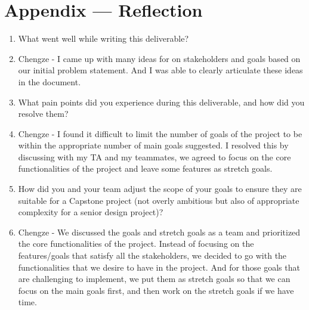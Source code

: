 \documentclass{article}
\begin{document}


\newpage{}

\section*{Appendix --- Reflection}




\begin{enumerate}
    \item What went well while writing this deliverable? 
    \item Chengze - I came up with many ideas for on stakeholders and goals based on our 
    initial problem statement. And I was able to clearly articulate these ideas in the document.

    \item What pain points did you experience during this deliverable, and how
    did you resolve them?
    \item Chengze - I found it difficult to limit the number of goals of the project to be
    within the appropriate number of main goals suggested. I resolved this by discussing with my TA and my teammates, we agreed 
    to focus on the core functionalities of the project and leave some features as stretch goals. 
    \item How did you and your team adjust the scope of your goals to ensure
    they are suitable for a Capstone project (not overly ambitious but also of
    appropriate complexity for a senior design project)?
    \item Chengze - We discussed the goals and stretch goals as a team and prioritized the core functionalities of the project.
    Instead of focusing on the features/goals that satisfy all the stakeholders, we decided to go with the functionalities that
    we desire to have in the project. And for those goals that are challenging to implement, we put them as stretch goals so that 
    we can focus on the main goals first, and then work on the stretch goals if we have time.
\end{enumerate}  
\end{document}
